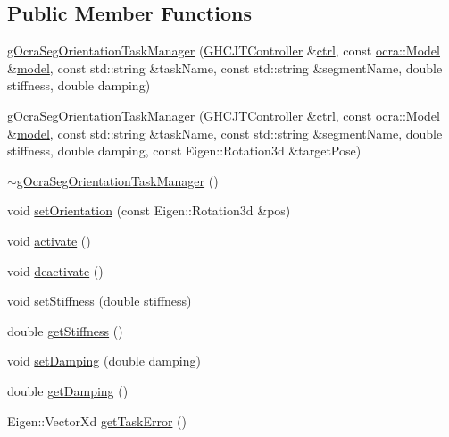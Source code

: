 \subsection*{Public Member Functions}
\begin{DoxyCompactItemize}
\item 
\hyperlink{classgocra_1_1gOcraSegOrientationTaskManager_a4d14922b755ae527247c7c82b1c99cdb}{g\+Ocra\+Seg\+Orientation\+Task\+Manager} (\hyperlink{classgocra_1_1GHCJTController}{G\+H\+C\+J\+T\+Controller} \&\hyperlink{classgocra_1_1gOcraTaskManagerBase_a52d76d9b54d92f3d31faeaafda99e4c7}{ctrl}, const \hyperlink{classocra_1_1Model}{ocra\+::\+Model} \&\hyperlink{classgocra_1_1gOcraTaskManagerBase_adc439e7170f7120611fc6d009d06404e}{model}, const std\+::string \&task\+Name, const std\+::string \&segment\+Name, double stiffness, double damping)
\item 
\hyperlink{classgocra_1_1gOcraSegOrientationTaskManager_abdf3dc20892fc1308806b72b9976461e}{g\+Ocra\+Seg\+Orientation\+Task\+Manager} (\hyperlink{classgocra_1_1GHCJTController}{G\+H\+C\+J\+T\+Controller} \&\hyperlink{classgocra_1_1gOcraTaskManagerBase_a52d76d9b54d92f3d31faeaafda99e4c7}{ctrl}, const \hyperlink{classocra_1_1Model}{ocra\+::\+Model} \&\hyperlink{classgocra_1_1gOcraTaskManagerBase_adc439e7170f7120611fc6d009d06404e}{model}, const std\+::string \&task\+Name, const std\+::string \&segment\+Name, double stiffness, double damping, const Eigen\+::\+Rotation3d \&target\+Pose)
\item 
\hyperlink{classgocra_1_1gOcraSegOrientationTaskManager_a24289f538bb64660dc9e294fcab261ae}{$\sim$g\+Ocra\+Seg\+Orientation\+Task\+Manager} ()
\item 
void \hyperlink{classgocra_1_1gOcraSegOrientationTaskManager_a3e0d8d41f14d2368777b5b84e0ef5d4f}{set\+Orientation} (const Eigen\+::\+Rotation3d \&pos)
\item 
void \hyperlink{classgocra_1_1gOcraSegOrientationTaskManager_aafe5bc35406c5d99288d05d6468e041f}{activate} ()
\item 
void \hyperlink{classgocra_1_1gOcraSegOrientationTaskManager_a5ebf0c1a5813c6a2895965d973f77539}{deactivate} ()
\item 
void \hyperlink{classgocra_1_1gOcraSegOrientationTaskManager_abca07f3d06e8731757a9946b5255a20c}{set\+Stiffness} (double stiffness)
\item 
double \hyperlink{classgocra_1_1gOcraSegOrientationTaskManager_a4003635cf40005d447614d2759280145}{get\+Stiffness} ()
\item 
void \hyperlink{classgocra_1_1gOcraSegOrientationTaskManager_acca4be597440e5da0e3ded3d78116c18}{set\+Damping} (double damping)
\item 
double \hyperlink{classgocra_1_1gOcraSegOrientationTaskManager_aa702c1703f667054e3d84e9a6791d15f}{get\+Damping} ()
\item 
Eigen\+::\+Vector\+Xd \hyperlink{classgocra_1_1gOcraSegOrientationTaskManager_a37aa69c90bd5d3d0318de77aa56cd4dd}{get\+Task\+Error} ()
\end{DoxyCompactItemize}
